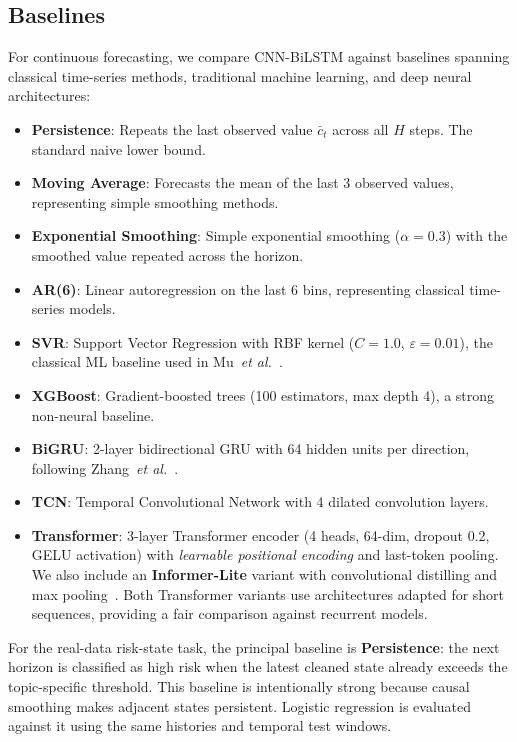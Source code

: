 \documentclass[journal]{IEEEtran}
\begin{document}
\subsection{Baselines}

For continuous forecasting, we compare CNN-BiLSTM against baselines spanning classical time-series methods, traditional machine learning, and deep neural architectures:

\begin{itemize}
\item \textbf{Persistence}: Repeats the last observed value $\bar{c}_t$ across all $H$ steps. The standard naive lower bound.
\item \textbf{Moving Average}: Forecasts the mean of the last 3 observed values, representing simple smoothing methods.
\item \textbf{Exponential Smoothing}: Simple exponential smoothing ($\alpha{=}0.3$) with the smoothed value repeated across the horizon.
\item \textbf{AR(6)}: Linear autoregression on the last 6 bins, representing classical time-series models.
\item \textbf{SVR}: Support Vector Regression with RBF kernel ($C{=}1.0$, $\varepsilon{=}0.01$), the classical ML baseline used in Mu~\emph{et al.}~\cite{Mu2023IPSO}.
\item \textbf{XGBoost}: Gradient-boosted trees (100 estimators, max depth 4), a strong non-neural baseline.
\item \textbf{BiGRU}: 2-layer bidirectional GRU with 64 hidden units per direction, following Zhang~\emph{et al.}~\cite{Zhang2024TRESP}.
\item \textbf{TCN}: Temporal Convolutional Network with 4 dilated convolution layers.
\item \textbf{Transformer}: 3-layer Transformer encoder (4 heads, 64-dim, dropout 0.2, GELU activation) with \emph{learnable positional encoding} and last-token pooling. We also include an \textbf{Informer-Lite} variant with convolutional distilling and max pooling~\cite{zhou2021informer}. Both Transformer variants use architectures adapted for short sequences, providing a fair comparison against recurrent models.
\end{itemize}

For the real-data risk-state task, the principal baseline is \textbf{Persistence}: the next horizon is classified as high risk when the latest cleaned state already exceeds the topic-specific threshold. This baseline is intentionally strong because causal smoothing makes adjacent states persistent. Logistic regression is evaluated against it using the same histories and temporal test windows.
\end{document}
